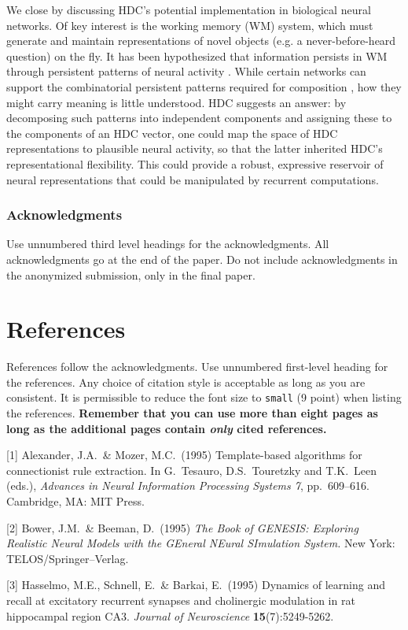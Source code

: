 \documentclass{article}
\begin{document}
We close by discussing HDC's potential implementation in biological neural networks. Of key interest is the working memory (WM) system, which must generate and maintain representations of novel objects (e.g. a never-before-heard question) on the fly. It has been hypothesized that information persists in WM through persistent patterns of neural activity \cite{Chaudhuri Nat Neuro}. While certain networks can support the combinatorial persistent patterns required for composition \cite{papers from CSHL application}, how they might carry meaning is little understood. HDC suggests an answer: by decomposing such patterns into independent components and assigning these to the components of an HDC vector, one could map the space of HDC representations to plausible neural activity, so that the latter inherited HDC's representational flexibility. This could provide a robust, expressive reservoir of neural representations that could be manipulated by recurrent computations.

\subsubsection*{Acknowledgments}

Use unnumbered third level headings for the acknowledgments. All acknowledgments
go at the end of the paper. Do not include acknowledgments in the anonymized
submission, only in the final paper.

\section*{References}

References follow the acknowledgments. Use unnumbered first-level heading for
the references. Any choice of citation style is acceptable as long as you are
consistent. It is permissible to reduce the font size to \verb+small+ (9 point)
when listing the references. {\bf Remember that you can use more than eight
  pages as long as the additional pages contain \emph{only} cited references.}
\medskip

\small

[1] Alexander, J.A.\ \& Mozer, M.C.\ (1995) Template-based algorithms for
connectionist rule extraction. In G.\ Tesauro, D.S.\ Touretzky and T.K.\ Leen
(eds.), {\it Advances in Neural Information Processing Systems 7},
pp.\ 609--616. Cambridge, MA: MIT Press.

[2] Bower, J.M.\ \& Beeman, D.\ (1995) {\it The Book of GENESIS: Exploring
  Realistic Neural Models with the GEneral NEural SImulation System.}  New York:
TELOS/Springer--Verlag.

[3] Hasselmo, M.E., Schnell, E.\ \& Barkai, E.\ (1995) Dynamics of learning and
recall at excitatory recurrent synapses and cholinergic modulation in rat
hippocampal region CA3. {\it Journal of Neuroscience} {\bf 15}(7):5249-5262.
\end{document}
